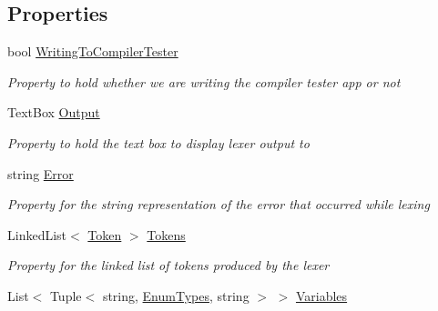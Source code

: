 \subsection*{Properties}
\begin{DoxyCompactItemize}
\item 
bool \hyperlink{class_c_p_u___o_s___simulator_1_1_compiler_1_1_frontend_1_1_lexer_ab036c4c1dbff32b7a8a54d58f4c4195c}{Writing\+To\+Compiler\+Tester}
\begin{DoxyCompactList}\small\item\em Property to hold whether we are writing the compiler tester app or not \end{DoxyCompactList}\item 
Text\+Box \hyperlink{class_c_p_u___o_s___simulator_1_1_compiler_1_1_frontend_1_1_lexer_adac6a4e1c23134a8c848bb35de4f39ff}{Output}
\begin{DoxyCompactList}\small\item\em Property to hold the text box to display lexer output to \end{DoxyCompactList}\item 
string \hyperlink{class_c_p_u___o_s___simulator_1_1_compiler_1_1_frontend_1_1_lexer_a0e9d13cd92a7b359a8857e940f0af767}{Error}
\begin{DoxyCompactList}\small\item\em Property for the string representation of the error that occurred while lexing \end{DoxyCompactList}\item 
Linked\+List$<$ \hyperlink{class_c_p_u___o_s___simulator_1_1_compiler_1_1_frontend_1_1_tokens_1_1_token}{Token} $>$ \hyperlink{class_c_p_u___o_s___simulator_1_1_compiler_1_1_frontend_1_1_lexer_a08611849f2bad0c53f5707d15dbdc840}{Tokens}
\begin{DoxyCompactList}\small\item\em Property for the linked list of tokens produced by the lexer \end{DoxyCompactList}\item 
List$<$ Tuple$<$ string, \hyperlink{namespace_c_p_u___o_s___simulator_1_1_compiler_1_1_frontend_1_1_tokens_a7c0cc43763cc9d01c7d5af34d70b96ea}{Enum\+Types}, string $>$ $>$ \hyperlink{class_c_p_u___o_s___simulator_1_1_compiler_1_1_frontend_1_1_lexer_abb832df2e4dc0a135eca9e20aeafc25f}{Variables}

\end{DoxyCompactItemize}
